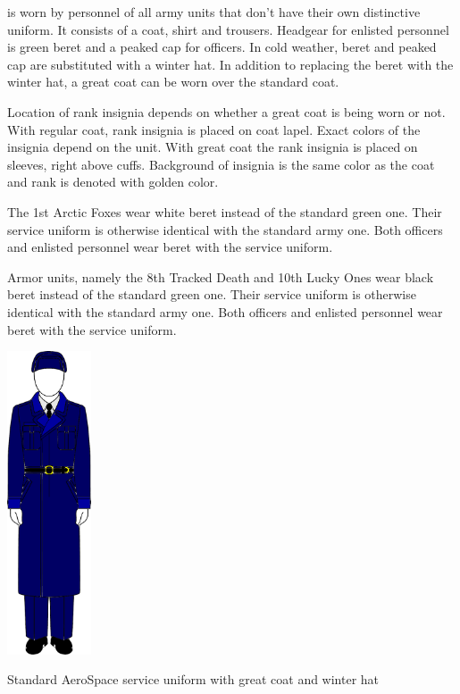 \documentclass{tufte-book}
\begin{document}
 is worn by personnel of all army
units that don't have their own distinctive uniform. It consists of a coat,
shirt and trousers. Headgear for enlisted personnel is green beret and
a peaked cap for officers. In cold weather, beret and peaked cap are
substituted with a winter hat. In addition to replacing the beret with 
the winter hat, a great coat can be worn over the standard coat.

Location of rank insignia depends on whether a great coat is being worn or
not. With regular coat, rank insignia is placed on coat lapel. Exact colors
of the insignia depend on the unit. With great coat the rank insignia is
placed on sleeves, right above cuffs. Background of insignia is the same color
as the coat and rank is denoted with golden color.

The 1st Arctic Foxes wear white beret instead of the standard green one. Their
service uniform is otherwise identical with the standard army one. Both
officers and enlisted personnel wear beret with the service uniform.

Armor units, namely the 8th Tracked Death and 10th Lucky Ones wear black beret
instead of the standard green one. Their service uniform is otherwise
identical with the standard army one. Both officers and enlisted personnel
wear beret with the service uniform.

\begin{marginfigure}[0\baselineskip]
  \includegraphics[width=2.5cm]{aerospace_great_coat}
  \caption{Standard AeroSpace service uniform with great coat and winter hat}
  \label{fig:aerospace_great_coat}
\end{marginfigure}
\end{document}
